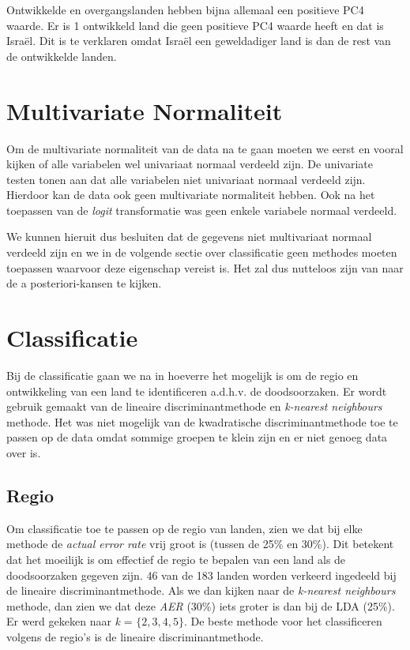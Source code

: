 \documentclass[a4paper,kulak]{kulakarticle}
\begin{document}
Ontwikkelde en overgangslanden hebben bijna allemaal een positieve PC4 waarde. Er is 1 ontwikkeld land die geen positieve PC4 waarde heeft en dat is Isra\"el. Dit is te verklaren omdat Isra\"el een geweldadiger land is dan de rest van de ontwikkelde landen. 



\section{Multivariate Normaliteit}
Om de multivariate normaliteit van de data na te gaan moeten we eerst en vooral kijken of alle variabelen wel univariaat normaal verdeeld zijn. De univariate testen tonen aan dat alle variabelen niet univariaat normaal verdeeld zijn. Hierdoor kan de data ook geen multivariate normaliteit hebben. Ook na het toepassen van de \textit{logit} transformatie was geen enkele variabele normaal verdeeld. 

We kunnen hieruit dus besluiten dat de gegevens niet multivariaat normaal verdeeld zijn en we in de volgende sectie over classificatie geen methodes moeten toepassen waarvoor deze eigenschap vereist is. Het zal dus nutteloos zijn van naar de a posteriori-kansen te kijken. 


\section{Classificatie}
Bij de classificatie gaan we na in hoeverre het mogelijk is om de regio en ontwikkeling van een land te identificeren a.d.h.v. de doodsoorzaken. Er wordt gebruik gemaakt van de lineaire discriminantmethode en \textit{k-nearest neighbours} methode. Het was niet mogelijk van de kwadratische discriminantmethode toe te passen op de data omdat sommige groepen te klein zijn en er niet genoeg data over is.

\subsection{Regio} %
Om classificatie toe te passen op de regio van landen, zien we dat bij elke methode de \textit{actual error rate} vrij groot is (tussen de 25\% en 30\%). Dit betekent dat het moeilijk is om effectief de regio te bepalen van een land als de doodsoorzaken gegeven zijn. 46 van de 183 landen worden verkeerd ingedeeld bij de lineaire discriminantmethode. Als we dan kijken naar de \textit{k-nearest neighbours} methode, dan zien we dat deze \textit{AER} (30\%) iets groter is dan bij de LDA (25\%). Er werd gekeken naar \textit{k} = $\{2,3,4,5\}$. De beste methode voor het classificeren volgens de regio's is de lineaire discriminantmethode. 
\end{document}
